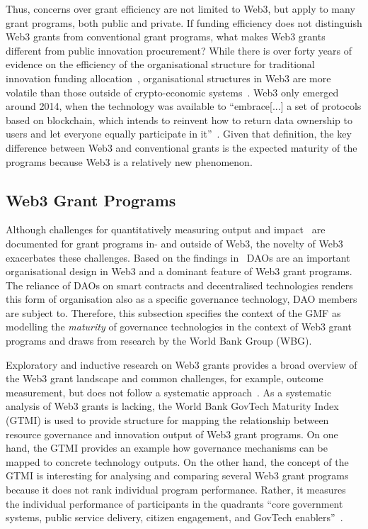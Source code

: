 \documentclass[conference]{IEEEtran}
\begin{document}
Thus, concerns over grant efficiency are not limited to Web3, but apply to many grant programs, both public and private. If funding efficiency does not distinguish Web3 grants from conventional grant programs, what makes Web3 grants different from public innovation procurement? While there is over forty years of evidence on the efficiency of the organisational structure for traditional innovation funding allocation~\cite[p.~4]{holmstrom_agency_1989}, organisational structures in Web3 are more volatile than those outside of crypto-economic systems~\cite[p.~25]{zuo_development_2023}. Web3 only emerged around 2014, when the technology was available to ``embrace[...] a set of protocols based on blockchain, which intends to reinvent how to return data ownership to users and let everyone equally participate in it''~\cite[p.~4]{wan_web3_2023}. Given that definition, the key difference between Web3 and conventional grants is the expected maturity of the programs because Web3 is a relatively new phenomenon.

\subsection{Web3 Grant Programs}

Although challenges for quantitatively measuring output and impact~\cite{ding_desci_2022,howell_financing_2017} are documented for grant programs in- and outside of Web3, the novelty of Web3 exacerbates these challenges. Based on the findings in~\cite{ding_desci_2022,wan_web3_2023} DAOs are an important organisational design in Web3 and a dominant feature of Web3 grant programs. The reliance of DAOs on smart contracts and decentralised technologies renders this form of organisation also as a specific governance technology, DAO members are subject to. Therefore, this subsection specifies the context of the GMF as modelling the \textit{maturity} of governance technologies in the context of Web3 grant programs and draws from research by the World Bank Group (WBG).

Exploratory and inductive research on Web3 grants provides a broad overview of the Web3 grant landscape and common challenges, for example, outcome measurement, but does not follow a systematic approach~\cite{leventhal_state_2023_long,leventhal_state_2024}. As a systematic analysis of Web3 grants is lacking, the World Bank GovTech Maturity Index (GTMI) is used to provide structure for mapping the relationship between resource governance and innovation output of Web3 grant programs. On one hand, the GTMI provides an example how governance mechanisms can be mapped to concrete technology outputs. On the other hand, the concept of the GTMI is interesting for analysing and comparing several Web3 grant programs because it does not rank individual program performance. Rather, it measures the individual performance of participants in the quadrants ``core government systems, public service delivery, citizen engagement, and GovTech enablers''~\cite[p.~5]{dener_govtech_2021}.
\end{document}

